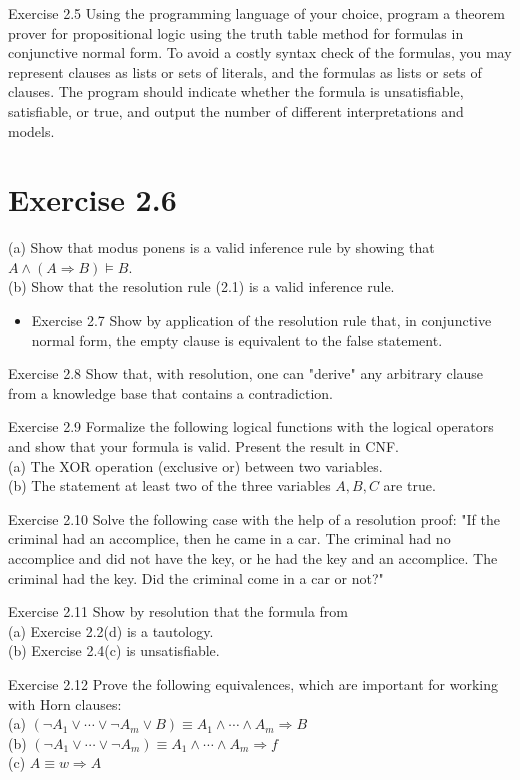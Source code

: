 \documentclass[10pt]{article}
\begin{document}
Exercise 2.5 Using the programming language of your choice, program a theorem prover for propositional logic using the truth table method for formulas in conjunctive normal form. To avoid a costly syntax check of the formulas, you may represent clauses as lists or sets of literals, and the formulas as lists or sets of clauses. The program should indicate whether the formula is unsatisfiable, satisfiable, or true, and output the number of different interpretations and models.

\section*{Exercise 2.6}
(a) Show that modus ponens is a valid inference rule by showing that $A \wedge(A \Rightarrow B) \models B$.\\
(b) Show that the resolution rule (2.1) is a valid inference rule.

\begin{itemize}
  \item Exercise 2.7 Show by application of the resolution rule that, in conjunctive normal form, the empty clause is equivalent to the false statement.
\end{itemize}

Exercise 2.8 Show that, with resolution, one can "derive" any arbitrary clause from a knowledge base that contains a contradiction.

Exercise 2.9 Formalize the following logical functions with the logical operators and show that your formula is valid. Present the result in CNF.\\
(a) The XOR operation (exclusive or) between two variables.\\
(b) The statement at least two of the three variables $A, B, C$ are true.

Exercise 2.10 Solve the following case with the help of a resolution proof: "If the criminal had an accomplice, then he came in a car. The criminal had no accomplice and did not have the key, or he had the key and an accomplice. The criminal had the key. Did the criminal come in a car or not?"

Exercise 2.11 Show by resolution that the formula from\\
(a) Exercise 2.2(d) is a tautology.\\
(b) Exercise 2.4(c) is unsatisfiable.

Exercise 2.12 Prove the following equivalences, which are important for working with Horn clauses:\\
(a) $\left(\neg A_{1} \vee \cdots \vee \neg A_{m} \vee B\right) \equiv A_{1} \wedge \cdots \wedge A_{m} \Rightarrow B$\\
(b) $\left(\neg A_{1} \vee \cdots \vee \neg A_{m}\right) \equiv A_{1} \wedge \cdots \wedge A_{m} \Rightarrow f$\\
(c) $A \equiv w \Rightarrow A$
\end{document}
